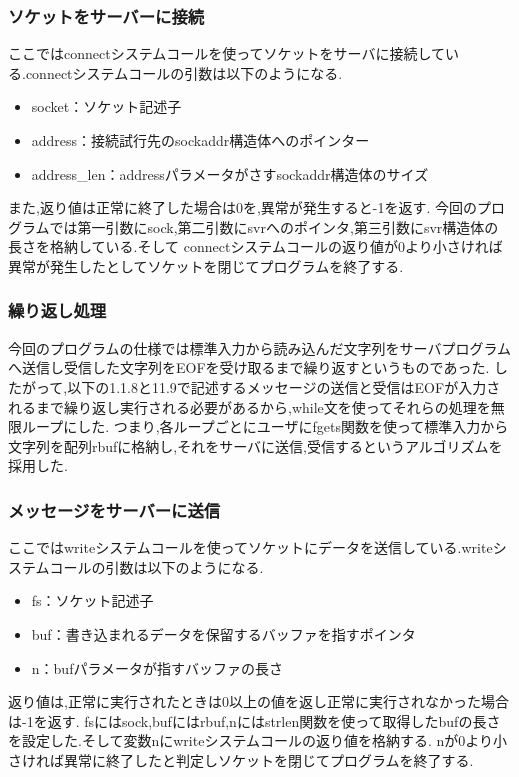 \documentclass[dvipdfmx]{jarticle}
\begin{document}
\subsubsection{ソケットをサーバーに接続}
ここではconnectシステムコールを使ってソケットをサーバに接続している.connectシステムコールの引数は以下のようになる.\cite{8}
\begin{itemize}
    \item socket：ソケット記述子
    \item address：接続試行先のsockaddr構造体へのポインター
    \item address\_len：addressパラメータがさすsockaddr構造体のサイズ
\end{itemize}
また,返り値は正常に終了した場合は0を,異常が発生すると-1を返す.
今回のプログラムでは第一引数にsock,第二引数にsvrへのポインタ,第三引数にsvr構造体の長さを格納している.そして
connectシステムコールの返り値が0より小さければ異常が発生したとしてソケットを閉じてプログラムを終了する.
\subsubsection{繰り返し処理}
今回のプログラムの仕様では標準入力から読み込んだ文字列をサーバプログラムへ送信し受信した文字列をEOFを受け取るまで繰り返すというものであった.
したがって,以下の1.1.8と11.9で記述するメッセージの送信と受信はEOFが入力されるまで繰り返し実行される必要があるから,while文を使ってそれらの処理を無限ループにした.
つまり,各ループごとにユーザにfgets関数を使って標準入力から文字列を配列rbufに格納し,それをサーバに送信,受信するというアルゴリズムを採用した.
\subsubsection{メッセージをサーバーに送信}
ここではwriteシステムコールを使ってソケットにデータを送信している.writeシステムコールの引数は以下のようになる.\cite{9}
\begin{itemize}
    \item fs：ソケット記述子
    \item buf：書き込まれるデータを保留するバッファを指すポインタ
    \item n：bufパラメータが指すバッファの長さ
\end{itemize}
返り値は,正常に実行されたときは0以上の値を返し正常に実行されなかった場合は-1を返す.
fsにはsock,bufにはrbuf,nにはstrlen関数を使って取得したbufの長さを設定した.そして変数nにwriteシステムコールの返り値を格納する.
nが0より小さければ異常に終了したと判定しソケットを閉じてプログラムを終了する.
\end{document}
